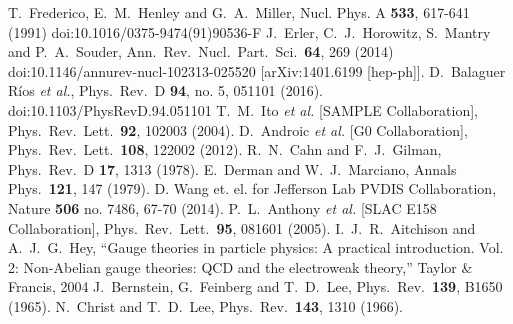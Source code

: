 \begin{thebibliography}{99}
 T.~Frederico, E.~M.~Henley and G.~A.~Miller, Nucl. Phys. A \textbf{533}, 617-641 (1991) doi:10.1016/0375-9474(91)90536-F
  J.~Erler, C.~J.~Horowitz, S.~Mantry and P.~A.~Souder, Ann.\ Rev.\ Nucl.\ Part.\ Sci.\  {\bf 64}, 269 (2014)   doi:10.1146/annurev-nucl-102313-025520  [arXiv:1401.6199 [hep-ph]].
 D.~Balaguer Ríos {\it et al.}, Phys.\ Rev.\ D {\bf 94}, no. 5, 051101 (2016).   doi:10.1103/PhysRevD.94.051101
 T.~M.~Ito {\it et al.} [SAMPLE Collaboration], Phys.\ Rev.\ Lett.\  {\bf 92}, 102003 (2004).
 D.~Androic {\it et al.} [G0 Collaboration], Phys.\ Rev.\ Lett.\  {\bf 108}, 122002 (2012).
 R.~N.~Cahn and F.~J.~Gilman, Phys.\ Rev.\ D {\bf 17}, 1313 (1978).
 E.~Derman and W.~J.~Marciano, Annals Phys.\  {\bf 121}, 147 (1979).
 D. Wang et. el. for Jefferson Lab PVDIS Collaboration,   Nature {\bf 506} no. 7486, 67-70 (2014). 
 P.~L.~Anthony {\it et al.} [SLAC E158 Collaboration], Phys.\ Rev.\ Lett.\  {\bf 95}, 081601 (2005). 
 I.~J.~R.~Aitchison and A.~J.~G.~Hey, ``Gauge theories in particle physics: A practical introduction. Vol. 2: Non-Abelian gauge theories: QCD and the electroweak theory,'' Taylor \& Francis, 2004 
 J.~Bernstein, G.~Feinberg and T.~D.~Lee, Phys.\ Rev.\  {\bf 139}, B1650 (1965).
 N.~Christ and T.~D.~Lee, Phys.\ Rev.\  {\bf 143}, 1310 (1966).
\end{thebibliography}
 
 \vspace{.5cm}

